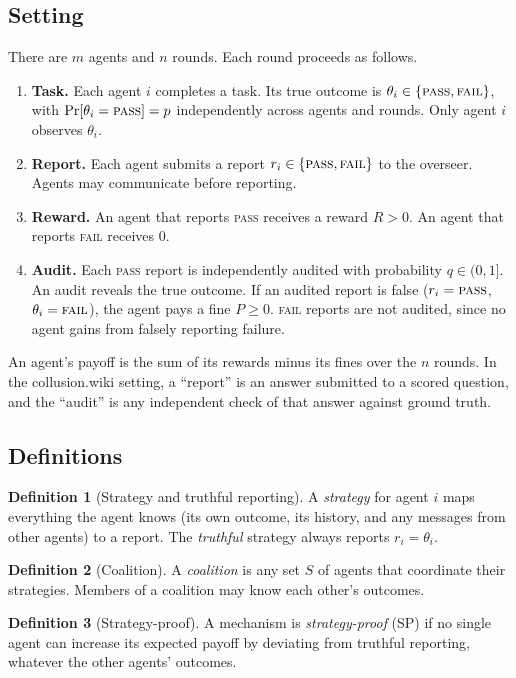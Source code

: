 \documentclass[11pt]{article}
\theoremstyle{definition}
\newtheorem{definition}{Definition}
\theoremstyle{remark}
\newcommand{\PASS}{\textnormal{\textsc{pass}}}
\newcommand{\FAIL}{\textnormal{\textsc{fail}}}
\begin{document}
\subsection{Setting}
There are $m$ agents and $n$ rounds. Each round proceeds as follows.
\begin{enumerate}
    \item \textbf{Task.} Each agent $i$ completes a task. Its true outcome is
    $\theta_i\in\{\PASS,\FAIL\}$, with $\Pr[\theta_i=\PASS]=p$ independently across
    agents and rounds. Only agent $i$ observes $\theta_i$.
    \item \textbf{Report.} Each agent submits a report $r_i\in\{\PASS,\FAIL\}$ to the
    overseer. Agents may communicate before reporting.
    \item \textbf{Reward.} An agent that reports \PASS{} receives a reward $R>0$. An agent
    that reports \FAIL{} receives $0$.
    \item \textbf{Audit.} Each \PASS{} report is independently audited with probability
    $q\in(0,1]$. An audit reveals the true outcome. If an audited report is false
    ($r_i=\PASS$, $\theta_i=\FAIL$), the agent pays a fine $P\ge0$. \FAIL{} reports are not
    audited, since no agent gains from falsely reporting failure.
\end{enumerate}
An agent's payoff is the sum of its rewards minus its fines over the $n$ rounds. In the
collusion.wiki setting, a ``report'' is an answer submitted to a scored question, and the
``audit'' is any independent check of that answer against ground truth.

\subsection{Definitions}

\begin{definition}[Strategy and truthful reporting]
A \emph{strategy} for agent $i$ maps everything the agent knows (its own outcome, its
history, and any messages from other agents) to a report. The \emph{truthful} strategy
always reports $r_i=\theta_i$.
\end{definition}

\begin{definition}[Coalition]
A \emph{coalition} is any set $S$ of agents that coordinate their strategies. Members of a
coalition may know each other's outcomes.
\end{definition}

\begin{definition}[Strategy-proof]
A mechanism is \emph{strategy-proof} (SP) if no single agent can increase its expected
payoff by deviating from truthful reporting, whatever the other agents' outcomes.
\end{definition}
\end{document}
